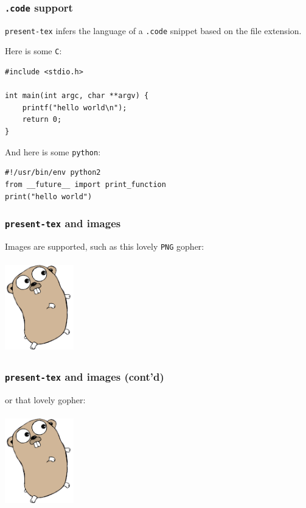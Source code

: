 \documentclass[9pt]{beamer}
\begin{document}
\begin{frame}[fragile]
\frametitle{\texttt{.code} support}


\texttt{present-tex} infers the language of a \texttt{.code} snippet based on the file extension.


Here is some \texttt{C}:


\begin{verbatim}
#include <stdio.h>

int main(int argc, char **argv) {
	printf("hello world\n");
	return 0;
}

\end{verbatim}

And here is some \texttt{python}:


\begin{verbatim}
#!/usr/bin/env python2
from __future__ import print_function
print("hello world")

\end{verbatim}


\end{frame}

\begin{frame}[fragile]
\frametitle{\texttt{present-tex} and images}


Images are supported, such as this lovely \texttt{PNG} gopher:


\begin{center}
\includegraphics[width=3cm,height=4cm]{_figs/gopher.png}
\end{center}


\end{frame}

\begin{frame}[fragile]
\frametitle{\texttt{present-tex} and images (cont'd)}


or that lovely gopher:


\begin{center}
\includegraphics[width=3cm,height=4cm]{_figs/gopher.png}
\end{center}


\end{frame}
\end{document}
